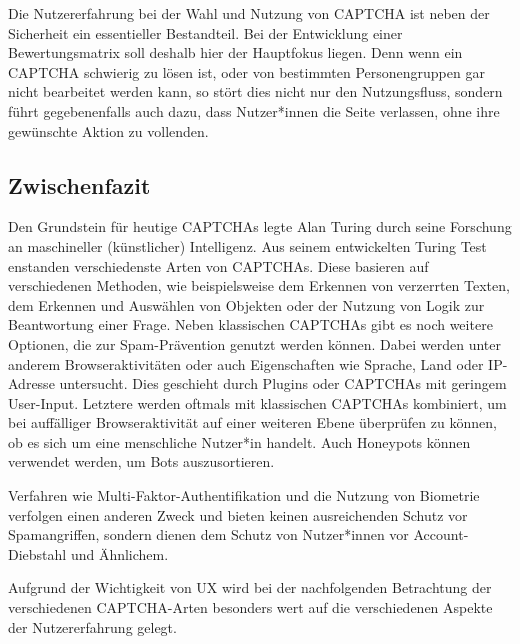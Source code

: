 Die Nutzererfahrung bei der Wahl und Nutzung von CAPTCHA ist neben der Sicherheit ein essentieller Bestandteil.
Bei der Entwicklung einer Bewertungsmatrix soll deshalb hier der Hauptfokus liegen.
Denn wenn ein CAPTCHA schwierig zu lösen ist, oder von bestimmten Personengruppen gar nicht bearbeitet werden kann, so stört dies nicht nur den Nutzungsfluss,
sondern führt gegebenenfalls auch dazu, dass Nutzer*innen die Seite verlassen, ohne ihre gewünschte Aktion zu vollenden. 

\subsection*{Zwischenfazit}
Den Grundstein für heutige CAPTCHAs legte Alan Turing durch seine Forschung an maschineller (künstlicher) Intelligenz.
Aus seinem entwickelten Turing Test enstanden verschiedenste Arten von CAPTCHAs.
Diese basieren auf verschiedenen Methoden, wie beispielsweise dem Erkennen von verzerrten Texten, dem Erkennen und Auswählen von Objekten oder
der Nutzung von Logik zur Beantwortung einer Frage.
Neben klassischen CAPTCHAs gibt es noch weitere Optionen, die zur Spam-Prävention genutzt werden können.
Dabei werden unter anderem Browseraktivitäten oder auch Eigenschaften wie Sprache, Land oder IP-Adresse untersucht.
Dies geschieht durch Plugins oder CAPTCHAs mit geringem User-Input.
Letztere werden oftmals mit klassischen CAPTCHAs kombiniert, um bei auffälliger Browseraktivität auf einer weiteren Ebene überprüfen zu können,
ob es sich um eine menschliche Nutzer*in handelt.
Auch Honeypots können verwendet werden, um Bots auszusortieren.

Verfahren wie Multi-Faktor-Authentifikation und die Nutzung von Biometrie verfolgen einen anderen Zweck 
und bieten keinen ausreichenden Schutz vor Spamangriffen, sondern dienen dem Schutz von Nutzer*innen vor Account-Diebstahl und Ähnlichem.

Aufgrund der Wichtigkeit von UX wird bei der nachfolgenden Betrachtung der verschiedenen CAPTCHA-Arten 
besonders wert auf die verschiedenen Aspekte der Nutzererfahrung gelegt.